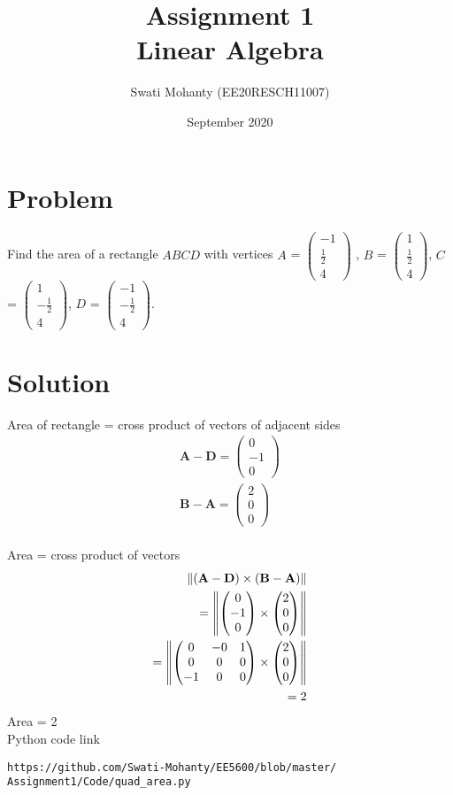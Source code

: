\documentclass[journal,12pt,twocolumn]{IEEEtran}
\title{Assignment 1
\\Linear Algebra }
\author{Swati Mohanty (EE20RESCH11007) }
\date{September 2020}
\newcommand{\myvec}[1]{\ensuremath{\begin{pmatrix}#1\end{pmatrix}}}
\let\vec\mathbf
\begin{document}
\maketitle


\section{Problem}
Find the area of a rectangle $ABCD$ with vertices $A$ = \myvec{-1 \\\frac{1}{2} \\4} , $B$ = \myvec{1 \\\frac{1}{2} \\4}, $C$ = \myvec{1 \\-\frac{1}{2} \\4}, $D$ = \myvec{-1 \\-\frac{1}{2} \\4}.
\section{Solution}
Area of rectangle = cross product of vectors of adjacent sides
\\\begin{align}
    \vec{A} - \vec{D} = \myvec{0 \\-1 \\0} 
    \\
    \vec{B} -\vec{A} = \myvec{2 \\0 \\0}
\end{align}   
\\Area = cross product of vectors
\\\begin{align}
    \norm{(\vec{A-D}) \times  (\vec{B-A})}   
    \\=\norm{\myvec{0 \\-1 \\0}  \times \myvec{2 \\0 \\0}} 
    \\=\norm{\myvec{0&-0&1 \\0&0&0 \\-1&0&0} \times \myvec{2 \\0 \\0}}
    \\= 2
\end{align}
Area = 2 
\\Python code link 
\begin{lstlisting}
https://github.com/Swati-Mohanty/EE5600/blob/master/
Assignment1/Code/quad_area.py
\end{lstlisting}
\end{document}
